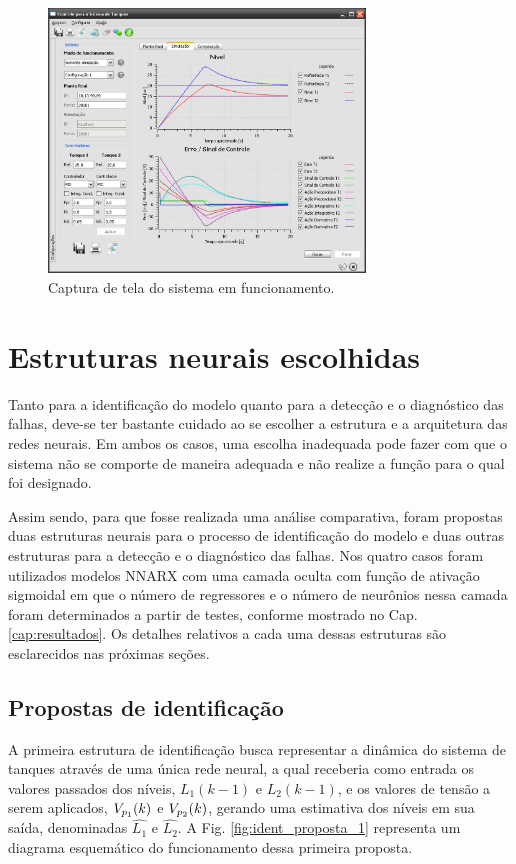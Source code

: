 \begin{figure}[htb]
\centering
    \includegraphics[width=0.75\textwidth]{imgs/sistema/eps/captura}
    \caption{Captura de tela do sistema em funcionamento.}
    \label{fig:captura}
\end{figure}

\section{Estruturas neurais escolhidas}
Tanto para a identificação do modelo quanto para a detecção e o diagnóstico das
falhas, deve-se ter bastante cuidado ao se escolher a estrutura e a arquitetura
das redes neurais. Em ambos os casos, uma escolha inadequada pode fazer com que
o sistema não se comporte de maneira adequada e não realize a função para o qual
foi designado. 

Assim sendo, para que fosse realizada uma análise comparativa, foram propostas
duas estruturas neurais para o processo de identificação do modelo e duas outras
estruturas para a detecção e o diagnóstico das falhas. Nos quatro casos foram
utilizados modelos NNARX com uma camada oculta com função de ativação sigmoidal
em que o número de regressores e o número de neurônios nessa camada foram
determinados a partir de testes, conforme mostrado no Cap. \ref{cap:resultados}.
Os detalhes relativos a cada uma dessas estruturas são esclarecidos nas próximas
seções.

\subsection{Propostas de identificação}
A primeira estrutura de identificação busca representar a dinâmica do sistema de
tanques através de uma única rede neural, a qual receberia como entrada os
valores passados dos níveis, $L_1(k-1)$ e $L_2(k-1)$, e os valores de tensão a
serem aplicados, $V_{p_{\tiny 1}}(k)$ e $V_{p_{\tiny 2}}(k)$, gerando uma
estimativa dos níveis em sua saída, denominadas $\widehat{L_1}$ e
$\widehat{L_2}$.  A Fig. \ref{fig:ident_proposta_1} representa um diagrama
esquemático do funcionamento dessa primeira proposta.

